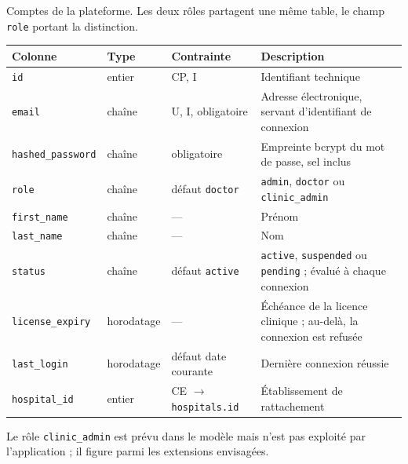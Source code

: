 Comptes de la plateforme. Les deux rôles partagent une même table, le champ
\texttt{role} portant la distinction.

\begin{table}[H]
\centering
\small
\begin{tabular}{@{}lllL{5.6cm}@{}}
\toprule
\textbf{Colonne} & \textbf{Type} & \textbf{Contrainte} & \textbf{Description} \\
\midrule
\texttt{id}               & entier     & CP, I & Identifiant technique \\
\texttt{email}            & chaîne     & U, I, obligatoire & Adresse électronique,
                                          servant d'identifiant de connexion \\
\texttt{hashed\_password} & chaîne     & obligatoire & Empreinte bcrypt du mot de
                                          passe, sel inclus \\
\texttt{role}             & chaîne     & défaut \texttt{doctor} & \texttt{admin},
                                          \texttt{doctor} ou \texttt{clinic\_admin} \\
\texttt{first\_name}      & chaîne     & --- & Prénom \\
\texttt{last\_name}       & chaîne     & --- & Nom \\
\texttt{status}           & chaîne     & défaut \texttt{active} & \texttt{active},
                                          \texttt{suspended} ou \texttt{pending} ;
                                          évalué à chaque connexion \\
\texttt{license\_expiry}  & horodatage & --- & Échéance de la licence clinique ;
                                          au-delà, la connexion est refusée \\
\texttt{last\_login}      & horodatage & défaut date courante & Dernière connexion
                                          réussie \\
\texttt{hospital\_id}     & entier     & CE $\to$ \texttt{hospitals.id} &
                                          Établissement de rattachement \\
\bottomrule
\end{tabular}
\end{table}

\noindent
Le rôle \texttt{clinic\_admin} est prévu dans le modèle mais n'est pas exploité par
l'application ; il figure parmi les extensions envisagées.

